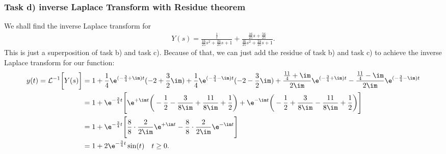 \subsubsection{Task d) inverse Laplace Transform with Residue theorem}
We shall find the inverse Laplace transform for
\begin{align}
	Y(s) = \frac{\frac{1}{s}}{\frac{16}{25} s^2 + \frac{24}{25} s + 1}+
	\frac{\frac{16}{25} s + \frac{56}{25}}{\frac{16}{25} s^2 + \frac{24}{25} s + 1}.
\end{align}
This is just a superposition of task b) and task c). Because of that, we can just add the residue of task b) and task c) to achieve the inverse Laplace transform for our function:
\begin{align}
	y(t) = \mathcal{L}^{-1}\bigg [Y(s)\bigg] &= 1 + \frac{1}{4}\e^{(-\frac{3}{4}+\im)t}(-2+\frac{3}{2}\im) + \frac{1}{4}\e^{(-\frac{3}{4}-\im)t}(-2-\frac{3}{2}\im) + \frac{\frac{11}{4}+\im}{2\im}\e^{(-\frac{3}{4}+\im)t} - \frac{\frac{11}{4}-\im}{2\im}\e^{(-\frac{3}{4}-\im)t} \nonumber \\
	&= 1 + \e^{-\frac{3}{4}t}\Bigg [\e^{+\im t}\bigg (-\frac{1}{2}-\frac{3}{8\im} +\frac{11}{8\im}+\frac{1}{2}\bigg ) + \e^{-\im t} \bigg (-\frac{1}{2}+\frac{3}{8\im} -\frac{11}{8\im}+\frac{1}{2} \bigg ) \Bigg ] \nonumber \\
	&= 1 + \e^{-\frac{3}{4}t}\Bigg [\frac{8}{8}\cdot\frac{2}{2\im}\e^{+\im t}-\frac{8}{8}\cdot\frac{2}{2\im}\e^{-\im t} \Bigg ] \nonumber \\
	&= 1 + 2\e^{-\frac{3}{4}t}\sin(t) \quad t \geq 0.
\end{align}
